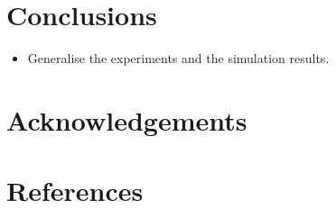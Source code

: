 \documentclass[review]{elsarticle}
\begin{document}
% 
% 
% 
% 
% 
% 







\section{Conclusions}
\color{red}
\begin{itemize}
		\item Generalise the experiments and the simulation results.
\end{itemize}





\section*{Acknowledgements}

\section*{References}

\pagebreak
\end{document}

